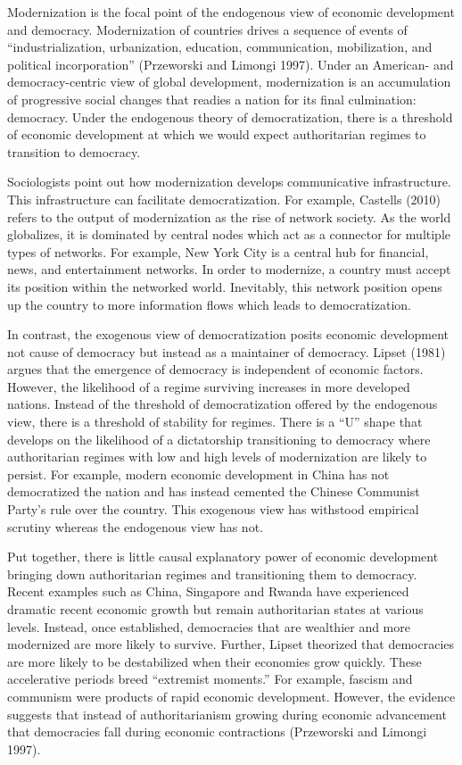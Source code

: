 \documentclass[12pt,]{article}
\begin{document}
Modernization is the focal point of the endogenous view of economic
development and democracy. Modernization of countries drives a sequence
of events of ``industrialization, urbanization, education,
communication, mobilization, and political incorporation'' (Przeworski
and Limongi 1997). Under an American- and democracy-centric view of
global development, modernization is an accumulation of progressive
social changes that readies a nation for its final culmination:
democracy. Under the endogenous theory of democratization, there is a
threshold of economic development at which we would expect authoritarian
regimes to transition to democracy.

Sociologists point out how modernization develops communicative
infrastructure. This infrastructure can facilitate democratization. For
example, Castells (2010) refers to the output of modernization as the
rise of network society. As the world globalizes, it is dominated by
central nodes which act as a connector for multiple types of networks.
For example, New York City is a central hub for financial, news, and
entertainment networks. In order to modernize, a country must accept its
position within the networked world. Inevitably, this network position
opens up the country to more information flows which leads to
democratization.

In contrast, the exogenous view of democratization posits economic
development not cause of democracy but instead as a maintainer of
democracy. Lipset (1981) argues that the emergence of democracy is
independent of economic factors. However, the likelihood of a regime
surviving increases in more developed nations. Instead of the threshold
of democratization offered by the endogenous view, there is a threshold
of stability for regimes. There is a ``U'' shape that develops on the
likelihood of a dictatorship transitioning to democracy where
authoritarian regimes with low and high levels of modernization are
likely to persist. For example, modern economic development in China has
not democratized the nation and has instead cemented the Chinese
Communist Party's rule over the country. This exogenous view has
withstood empirical scrutiny whereas the endogenous view has not.

Put together, there is little causal explanatory power of economic
development bringing down authoritarian regimes and transitioning them
to democracy. Recent examples such as China, Singapore and Rwanda have
experienced dramatic recent economic growth but remain authoritarian
states at various levels. Instead, once established, democracies that
are wealthier and more modernized are more likely to survive. Further,
Lipset theorized that democracies are more likely to be destabilized
when their economies grow quickly. These accelerative periods breed
``extremist moments.'' For example, fascism and communism were products
of rapid economic development. However, the evidence suggests that
instead of authoritarianism growing during economic advancement that
democracies fall during economic contractions (Przeworski and Limongi
1997).
\end{document}
